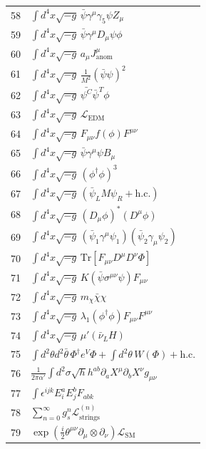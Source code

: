 \documentclass[11pt,a4paper]{article}
\begin{document}
\begin{longtable}{r p{}}
	58 & \(\displaystyle \int d^4x\sqrt{-g}\,\bar\psi\gamma^\mu\gamma_5\psi Z_\mu\) \\
	59 & \(\displaystyle \int d^4x\sqrt{-g}\,\bar\psi\gamma^\mu D_\mu\psi\phi\) \\
	60 & \(\displaystyle \int d^4x\sqrt{-g}\,a_\mu J^\mu_{\text{anom}}\) \\
	61 & \(\displaystyle \int d^4x\sqrt{-g}\,\frac{1}{M^2}(\bar\psi\psi)^2\) \\
	62 & \(\displaystyle \int d^4x\sqrt{-g}\,\bar{\psi^C}\bar{\psi}^T\phi\) \\
	63 & \(\displaystyle \int d^4x\sqrt{-g}\,\mathcal{L}_{\text{EDM}}\) \\
	64 & \(\displaystyle \int d^4x\sqrt{-g}\,F_{\mu\nu}f(\phi)F^{\mu\nu}\) \\
	65 & \(\displaystyle \int d^4x\sqrt{-g}\,\bar\psi\gamma^\mu\psi B_\mu\) \\
	66 & \(\displaystyle \int d^4x\sqrt{-g}\,(\phi^\dagger\phi)^3\) \\
	67 & \(\displaystyle \int d^4x\sqrt{-g}\,(\bar\psi_L M \psi_R + \text{h.c.})\) \\
	68 & \(\displaystyle \int d^4x\sqrt{-g}\,(D_\mu\phi)^*(D^\mu\phi)\) \\
	69 & \(\displaystyle \int d^4x\sqrt{-g}\,(\bar\psi_1\gamma^\mu\psi_1)(\bar\psi_2\gamma_\mu\psi_2)\) \\
	70 & \(\displaystyle \int d^4x\sqrt{-g}\,\mathrm{Tr}[F_{\mu\nu}D^\mu D^\nu\Phi]\) \\
	71 & \(\displaystyle \int d^4x\sqrt{-g}\,K(\bar\psi\sigma^{\mu\nu}\psi)F_{\mu\nu}\) \\
	72 & \(\displaystyle \int d^4x\sqrt{-g}\,m_\chi\bar\chi\chi\) \\
	73 & \(\displaystyle \int d^4x\sqrt{-g}\,\lambda_1(\phi^\dagger\phi)F_{\mu\nu}F^{\mu\nu}\) \\
	74 & \(\displaystyle \int d^4x\sqrt{-g}\,\mu'(\bar\nu_L H)\) \\
	75 & \(\displaystyle \int d^2\theta d^2\bar\theta\,\Phi^\dagger e^V\Phi + \int d^2\theta\,W(\Phi) + \text{h.c.}\) \\
	76 & \(\displaystyle \frac{1}{2\pi\alpha'}\int d^2\sigma\sqrt{h}h^{ab}\partial_a X^\mu\partial_b X^\nu g_{\mu\nu}\) \\
	77 & \(\displaystyle \int \epsilon^{ijk}E_i^a E_j^b F_{ab k}\) \\
	78 & \(\displaystyle \sum_{n=0}^\infty g_s^n \mathcal{L}^{(n)}_{\text{strings}}\) \\
	79 & \(\displaystyle \exp\left(\frac{i}{2}\theta^{\mu\nu}\partial_\mu\otimes\partial_\nu\right)\mathcal{L}_{\text{SM}}\) \\

\end{longtable}
\end{document}
